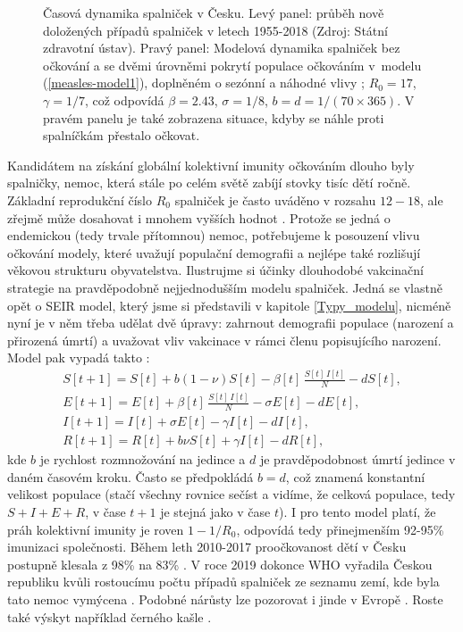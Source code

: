 \begin{figure}[h]
\begin{center}
\begin{minipage}[m]{0.45\linewidth}
		\end{minipage}
	\end{center}
	\caption{Časová dynamika spalniček v Česku. Levý panel: průběh nově doložených případů spalniček v letech 1955-2018 (Zdroj: Státní zdravotní ústav). Pravý panel: Modelová dynamika spalniček bez očkování a se dvěmi úrovněmi pokrytí populace očkováním v~modelu (\ref{measles-model1}), doplněném o sezónní a náhodné vlivy \cite{KeelingRohani2008}; $R_0=17$, $\gamma=1/7$, což odpovídá $\beta=2.43$, $\sigma=1/8$, $b=d=1/(70\times365)$. V pravém panelu je také zobrazena situace, kdyby se náhle proti spalníčkám přestalo očkovat.}
	\label{measles1}
\end{figure}

Kandidátem na získání globální kolektivní imunity očkováním dlouho byly spalničky, nemoc, která stále po celém světě zabíjí stovky tisíc dětí ročně. Základní reprodukční číslo $R_0$ spalniček je často uváděno v rozsahu $12-18$, ale zřejmě může dosahovat i mnohem vyšších hodnot \cite{Guerra_etal2017}. Protože se jedná o endemickou (tedy trvale přítomnou) nemoc, potřebujeme k posouzení vlivu očkování modely, které uvažují populační demografii a nejlépe také rozlišují věkovou strukturu obyvatelstva. Ilustrujme si účinky dlouhodobé vakcinační strategie na pravděpodobně nejjednodušším modelu spalniček. Jedná se vlastně opět o SEIR model, který jsme si představili v kapitole \ref{Typy_modelu}, nicméně nyní je v něm třeba udělat dvě úpravy: zahrnout demografii populace (narození a přirozená úmrtí) a uvažovat vliv vakcinace v rámci členu popisujícího narození. Model pak vypadá takto \cite{BolkerGrenfell1993}:
\begin{equation}
	\begin{array}{l}
		\displaystyle{S[t+1] = S[t] + b (1-\nu) S[t] - \beta[t] \, \frac{S[t]\,I[t]}{N} - d S[t]}, \\[3ex]
		\displaystyle{E[t+1] = E[t] + \beta[t] \, \frac{S[t]\,I[t]}{N} - \sigma E[t] - d E[t]}, \\[3ex]
		\displaystyle{I[t+1] = I[t] + \sigma E[t] - \gamma I[t] - d I[t]}, \\[3ex]
		\displaystyle{R[t+1] = R[t] + b \nu S[t] + \gamma I[t] - d R[t]},
	\end{array}
	\label{measles-model1}
\end{equation}
kde $b$ je rychlost rozmnožování na jedince a $d$ je pravděpodobnost úmrtí jedince v daném časovém kroku. Často se předpokládá $b=d$, což znamená konstantní velikost populace (stačí všechny rovnice sečíst a vidíme, že celková populace, tedy $S+I+E+R$, v čase $t+1$ je stejná jako v čase $t$). I pro tento model platí, že práh kolektivní imunity je roven $1-1/R_0$, odpovídá tedy přinejmenším 92-95\% imunizaci společnosti. Během leth 2010-2017 proočkovanost dětí v Česku postupně klesala z 98\% na 83\% \cite{spavac}. V roce 2019 dokonce WHO vyřadila Českou republiku kvůli rostoucímu počtu případů spalniček ze seznamu zemí, kde byla tato nemoc vymýcena \cite{spaend}. Podobné nárůsty lze pozorovat i jinde v Evropě \cite{Thornton2019}. Roste také výskyt například černého kašle \cite{Lavine_etal2011}. 

